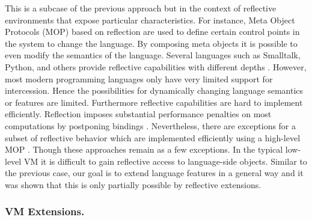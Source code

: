 This is a subcase of the previous approach but in the context of reflective environments that expose particular characteristics.
For instance, Meta Object Protocols (MOP) \cite{Kicz91a} based on reflection \cite{Maes87a} are used to define certain control points in the system to change the language.
By composing meta objects it is possible to even modify the semantics of the language. 
Several languages such as Smalltalk, Python, and others provide reflective capabilities with different depths \cite{Ande98a,Flan08a,Van10a}.
However, most modern programming languages only have very limited support for intercession.
Hence the possibilities for dynamically changing language semantics or features are limited. 
Furthermore reflective capabilities are hard to implement efficiently.
Reflection imposes substantial performance penalties on most computations by postponing bindings \cite{Male96a}. 
Nevertheless, there are exceptions for a subset of reflective behavior which are implemented efficiently using a high-level MOP \cite{Vran12a}.
Though these approaches remain as a few exceptions.
In the typical low-level VM it is difficult to gain reflective access to language-side objects.
Similar to the previous case, our goal is to extend language features in a general way and it was shown that this is only partially possible by reflective extensions. 


\vspace{-2mm}
\subsubsection{VM Extensions.}

